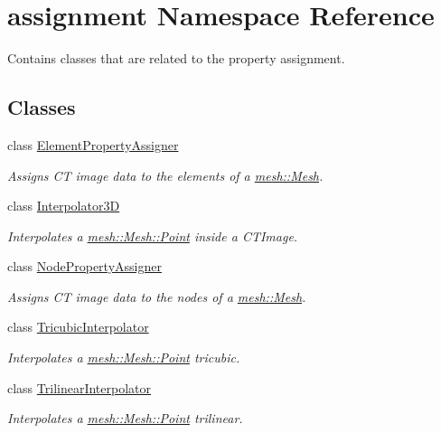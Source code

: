 \hypertarget{namespaceassignment}{
\section{assignment Namespace Reference}
\label{namespaceassignment}
}


Contains classes that are related to the property assignment.  


\subsection*{Classes}
\begin{DoxyCompactItemize}
\item 
class \hyperlink{classassignment_1_1_element_property_assigner}{ElementPropertyAssigner}
\begin{DoxyCompactList}\small\item\em Assigns CT image data to the elements of a \hyperlink{classmesh_1_1_mesh}{mesh::Mesh}. \item\end{DoxyCompactList}\item 
class \hyperlink{classassignment_1_1_interpolator3_d}{Interpolator3D}
\begin{DoxyCompactList}\small\item\em Interpolates a \hyperlink{structmesh_1_1_mesh_1_1_point}{mesh::Mesh::Point} inside a CTImage. \item\end{DoxyCompactList}\item 
class \hyperlink{classassignment_1_1_node_property_assigner}{NodePropertyAssigner}
\begin{DoxyCompactList}\small\item\em Assigns CT image data to the nodes of a \hyperlink{classmesh_1_1_mesh}{mesh::Mesh}. \item\end{DoxyCompactList}\item 
class \hyperlink{classassignment_1_1_tricubic_interpolator}{TricubicInterpolator}
\begin{DoxyCompactList}\small\item\em Interpolates a \hyperlink{structmesh_1_1_mesh_1_1_point}{mesh::Mesh::Point} tricubic. \item\end{DoxyCompactList}\item 
class \hyperlink{classassignment_1_1_trilinear_interpolator}{TrilinearInterpolator}
\begin{DoxyCompactList}\small\item\em Interpolates a \hyperlink{structmesh_1_1_mesh_1_1_point}{mesh::Mesh::Point} trilinear. \item\end{DoxyCompactList}\end{DoxyCompactItemize}
